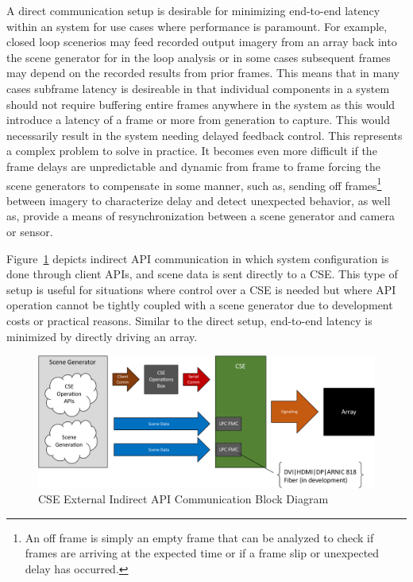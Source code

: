         A direct communication setup is desirable for minimizing end-to-end latency within an system for use cases where performance is paramount. For example, closed loop scenerios may feed recorded output imagery from an array back into the scene generator for in the loop analysis or in some cases subsequent frames may depend on the recorded results from prior frames. This means that in many cases subframe latency is desireable in that individual components in a system should not require buffering entire frames anywhere in the system as this would introduce a latency of a frame or more from generation to capture. This would necessarily result in the system needing delayed feedback control\cite{HuWang2002}. This represents a complex problem to solve in practice. It becomes even more difficult if the frame delays are unpredictable and dynamic from frame to frame forcing the scene generators to compensate in some manner, such as, sending off frames\footnote{An off frame is simply an empty frame that can be analyzed to check if frames are arriving at the expected time or if a frame slip or unexpected delay has occurred.} between imagery to characterize delay and detect unexpected behavior, as well as, provide a means of resynchronization between a scene generator and camera or sensor.

        Figure~\ref{fig:external_cse_comm_half_indirect} depicts indirect API communication in which system configuration is done through client APIs, and scene data is sent directly to a CSE. This type of setup is useful for situations where control over a CSE is needed but where API operation cannot be tightly coupled with a scene generator due to development costs or practical reasons. Similar to the direct setup, end-to-end latency is minimized by directly driving an array.

        \begin{figure}
            \centering
            \includegraphics[width=1.0\textwidth]{fig/external_cse_comm_half_indirect.pdf}
            \caption{CSE External Indirect API Communication Block Diagram}
            \label{fig:external_cse_comm_half_indirect}
        \end{figure}

